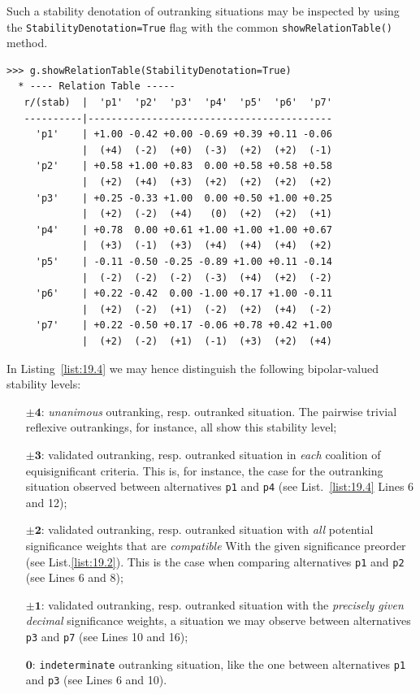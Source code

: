 Such a stability denotation of outranking situations may be inspected by using the \texttt{StabilityDenotation=True} flag  with the common \texttt{showRelationTable()} method.
\begin{lstlisting}[caption={Bipolar-valued outranking relation table with stability denotation},label=list:19.4]
>>> g.showRelationTable(StabilityDenotation=True)
  * ---- Relation Table -----
   r/(stab)  |  'p1'  'p2'  'p3'  'p4'  'p5'  'p6'  'p7'   
   ----------|------------------------------------------
     'p1'    | +1.00 -0.42 +0.00 -0.69 +0.39 +0.11 -0.06  
             |  (+4)  (-2)  (+0)  (-3)  (+2)  (+2)  (-1)  
     'p2'    | +0.58 +1.00 +0.83  0.00 +0.58 +0.58 +0.58  
             |  (+2)  (+4)  (+3)  (+2)  (+2)  (+2)  (+2)  
     'p3'    | +0.25 -0.33 +1.00  0.00 +0.50 +1.00 +0.25  
             |  (+2)  (-2)  (+4)   (0)  (+2)  (+2)  (+1)  
     'p4'    | +0.78  0.00 +0.61 +1.00 +1.00 +1.00 +0.67  
             |  (+3)  (-1)  (+3)  (+4)  (+4)  (+4)  (+2)  
     'p5'    | -0.11 -0.50 -0.25 -0.89 +1.00 +0.11 -0.14  
             |  (-2)  (-2)  (-2)  (-3)  (+4)  (+2)  (-2)  
     'p6'    | +0.22 -0.42  0.00 -1.00 +0.17 +1.00 -0.11
             |  (+2)  (-2)  (+1)  (-2)  (+2)  (+4)  (-2)  
     'p7'    | +0.22 -0.50 +0.17 -0.06 +0.78 +0.42 +1.00  
             |  (+2)  (-2)  (+1)  (-1)  (+3)  (+2)  (+4)  
\end{lstlisting}
In Listing~\vref{list:19.4} we may hence distinguish the following bipolar-valued stability levels:
\begin{itemize}[leftmargin=1cm]
\item [$\mathbf{\pm 4}$:] \emph{unanimous} outranking, resp. outranked situation. The pairwise trivial reflexive outrankings, for instance, all show this stability level;
\item [$\mathbf{\pm 3}$:] validated outranking, resp. outranked situation in \emph{each} coalition of equisignificant criteria. This is, for instance, the case for the outranking situation observed between alternatives \texttt{p1} and \texttt{p4} (see List.~\vref{list:19.4} Lines 6 and 12);
\item [$\mathbf{\pm 2}$:] validated outranking, resp. outranked situation with \emph{all} potential significance weights that are \emph{compatible} With the given significance preorder (see List.\vref{list:19.2}). This is the case when comparing alternatives \texttt{p1} and \texttt{p2} (see Lines 6 and 8);
\item [$\mathbf{\pm 1}$:] validated outranking, resp. outranked situation with the \emph{precisely given decimal} significance weights, a situation we may observe between alternatives \texttt{p3} and \texttt{p7} (see Lines 10 and 16);
\item [$\mathbf{0}$:] \texttt{indeterminate} outranking situation, like the one between alternatives \texttt{p1} and \texttt{p3} (see Lines 6 and 10).
\end{itemize}


